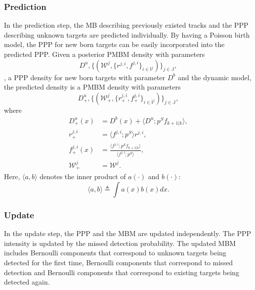 \subsubsection{Prediction}
In the prediction step, the MB describing previously existed tracks and the PPP describing unknown targets are predicted individually. By having a Poisson birth model, the PPP for new born targets can be easily incorporated into the predicted PPP. Given a posterior PMBM density with parameters
\begin{equation}
    D^u, \{(\mathcal{W}^j,\{r^{j,i},f^{j,i}\}_{i\in\mathbb{I}^j})\}_{j\in\mathbb{J}}, 
\end{equation}
, a PPP density for new born targets with parameter $D^b$ and the dynamic model, the predicted density is a PMBM density with parameters \cite{pmbmextended2}
\begin{equation}
    D^u_+, \{(\mathcal{W}^j_+,\{r^{j,i}_+,f^{j,i}_+\}_{i\in\mathbb{I}^j})\}_{j\in\mathbb{J}}, 
    \label{eq:pmbmpara}
\end{equation}
where
\begin{subequations}
\begin{align}
D^u_+(x) &= D^b(x) + \langle D^u;p^Sf_{k+1|k}\rangle,\\
r^{j,i}_+ &= \langle f^{j,i};p^S\rangle r^{j,i},\\
f^{j,i}_+(x) &= \frac{\langle f^{j,i};p^Sf_{k+1|k}\rangle}{\langle f^{j,i};p^S\rangle},\\
\mathcal{W}^j_+ &= \mathcal{W}^j.
\end{align}
\end{subequations}
Here, $\langle a,b\rangle$ denotes the inner product of $a(\cdot)$ and $b(\cdot)$:
\begin{equation}
    \langle a,b\rangle \triangleq \int a(x)b(x)dx.
\end{equation}



\subsubsection{Update}
In the update step, the PPP and the MBM are updated independently.
The PPP intensity is updated by the missed detection probability. The updated MBM includes Bernoulli components that correspond to unknown targets being detected for the first time, Bernoulli components that correspond to missed detection and Bernoulli components that correspond to existing targets being detected again.

